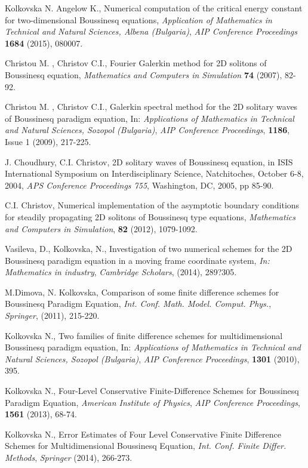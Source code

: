 \documentclass[a5paper]{article}
\theoremstyle{remark}
\begin{document}
\begin{large}
\begin{thebibliography}{99}
	 Kolkovska N. Angelow K., Numerical computation of the critical energy constant for two-dimensional Boussinesq equations,
{\it Application of Mathematics in Technical and Natural Sciences, Albena (Bulgaria)},
\emph{AIP Conference Proceedings}  \textbf{1684} (2015), 080007.

	 Christou M. , Christov C.I.,
Fourier Galerkin method for 2D solitons of Boussinesq equation,
{\it Mathematics and Computers in Simulation} \textbf{74} (2007), 82-92.

	 Christou M. , Christov C.I.,
Galerkin spectral method for the 2D solitary waves of Boussinesq paradigm equation,
In: {\it Applications of Mathematics in Technical and Natural Sciences, Sozopol (Bulgaria)},
\emph{AIP Conference Proceedings}, \textbf{1186}, Issue 1 (2009), 217-225.

	 J. Choudhury, C.I. Christov,
2D solitary waves of Boussinesq equation, in ISIS International Symposium on Interdisciplinary Science, Natchitoches, October 6-8, 2004, {\it APS Conference Proceedings 755}, Washington, DC, 2005, pp 85-90.

	 C.I. Christov,
Numerical implementation of the asymptotic boundary conditions for steadily propagating 2D solitons of Boussinesq type equations,
{\it Mathematics and Computers in Simulation}, \textbf{82} (2012), 1079-1092.

	 Vasileva, D., Kolkovska, N., Investigation of two numerical schemes for the 2D Boussinesq paradigm equation in a moving frame coordinate system, {\it In: Mathematics in industry},
\emph{Cambridge Scholars}, (2014), 289?305.

	 M.Dimova, N. Kolkovska, Comparison of some finite difference schemes for Boussinesq Paradigm Equation, 
{\it Int. Conf. Math. Model. Comput. Phys.}, \emph{Springer}, (2011), 215-220.

	 Kolkovska N., Two families of finite difference schemes for multidimensional Boussinesq paradigm equation, In:
{\it Applications of Mathematics in Technical and Natural Sciences,  Sozopol (Bulgaria)},
\emph{AIP Conference Proceedings}, \textbf{1301} (2010), 395.

	 Kolkovska N., Four-Level Conservative Finite-Difference Schemes for Boussinesq Paradigm Equation, {\it American Institute of Physics},
\emph{AIP Conference Proceedings}, \textbf{1561} (2013), 68-74.

	 Kolkovska N., Error Estimates of Four Level Conservative Finite Difference Schemes for Multidimensional Boussinesq  Equation,  {\it Int. Conf. Finite Differ. Methods}, \emph{Springer} (2014), 266-273.


\end{thebibliography}
\end{large}
\end{document}
